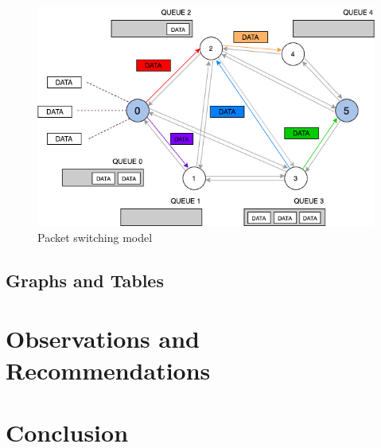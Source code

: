 \documentclass{article}
\begin{document}
      \begin{figure}[h]
  \centering
          \includegraphics[totalheight=8cm]{images/graph_ps.png}
  \renewcommand\figurename{Figure}
      \caption{Packet switching model}
      \label{fig:graph_ps}
  \end{figure}
  

  \subsection{Graphs and Tables}



  \section{Observations and Recommendations}



  \section{Conclusion}
\end{document}
